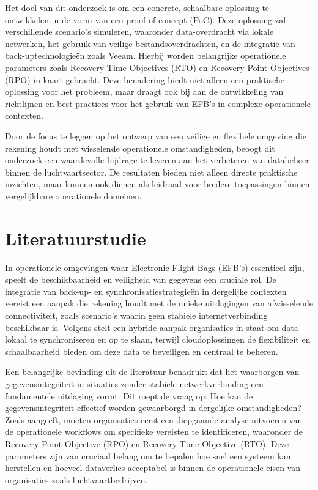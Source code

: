 Het doel van dit onderzoek is om een concrete, schaalbare oplossing te ontwikkelen in de vorm van een proof-of-concept (PoC). Deze oplossing zal verschillende scenario’s simuleren, waaronder data-overdracht via lokale netwerken, het gebruik van veilige bestandsoverdrachten, en de integratie van back-uptechnologieën zoals Veeam. Hierbij worden belangrijke operationele parameters zoals Recovery Time Objectives (RTO) en Recovery Point Objectives (RPO) in kaart gebracht. Deze benadering biedt niet alleen een praktische oplossing voor het probleem, maar draagt ook bij aan de ontwikkeling van richtlijnen en best practices voor het gebruik van EFB's in complexe operationele contexten.

Door de focus te leggen op het ontwerp van een veilige en flexibele omgeving die rekening houdt met wisselende operationele omstandigheden, beoogt dit onderzoek een waardevolle bijdrage te leveren aan het verbeteren van databeheer binnen de luchtvaartsector. De resultaten bieden niet alleen directe praktische inzichten, maar kunnen ook dienen als leidraad voor bredere toepassingen binnen vergelijkbare operationele domeinen.
​
\section{Literatuurstudie}%
\label{sec}

In operationele omgevingen waar Electronic Flight Bags (EFB's) essentieel zijn, speelt de beschikbaarheid en veiligheid van gegevens een cruciale rol. De integratie van back-up- en synchronisatiestrategieën in dergelijke contexten vereist een aanpak die rekening houdt met de unieke uitdagingen van afwisselende connectiviteit, zoals scenario's waarin geen stabiele internetverbinding beschikbaar is. Volgens \textcite{Yanamala2024} stelt een hybride aanpak organisaties in staat om data lokaal te synchroniseren en op te slaan, terwijl cloudoplossingen de flexibiliteit en schaalbaarheid bieden om deze data te beveiligen en centraal te beheren.

Een belangrijke bevinding uit de literatuur benadrukt dat het waarborgen van gegevensintegriteit in situaties zonder stabiele netwerkverbinding een fundamentele uitdaging vormt. Dit roept de vraag op: Hoe kan de gegevensintegriteit effectief worden gewaarborgd in dergelijke omstandigheden?
Zoals \textcite{Abdelaziz48PP100_116} aangeeft, moeten organisaties eerst een diepgaande analyse uitvoeren van de operationele workflows om specifieke vereisten te identificeren, waaronder de Recovery Point Objective (RPO) en Recovery Time Objective (RTO). Deze parameters zijn van cruciaal belang om te bepalen hoe snel een systeem kan herstellen en hoeveel dataverlies acceptabel is binnen de operationele eisen van organisaties zoals luchtvaartbedrijven.

